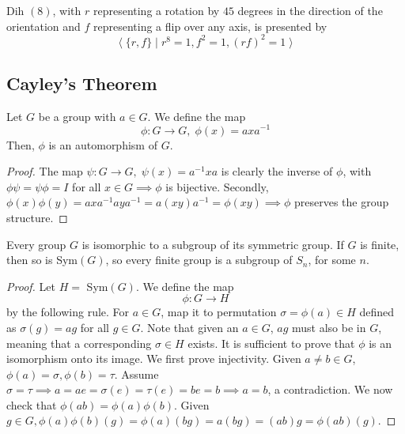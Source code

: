 \documentclass{article}
\begin{document}
      \begin{example}
        Dih $(8)$, with $r$ representing a rotation by $45$ degrees in the direction of the orientation and $f$ representing a flip over any axis, is presented by
        \begin{equation}
          \big\langle \; \{ r, f\} \; | \; r^{8} = 1, f^{2} = 1, (r f)^{2} = 1 \;\big\rangle
        \end{equation}
      \end{example}

  \subsection{Cayley's Theorem}

    \begin{lemma}
      Let $G$ be a group with $a \in G$. We define the map
      \begin{equation}
        \phi: G \longrightarrow G, \; \phi (x) = a x a^{-1}
      \end{equation}
      Then, $\phi$ is an automorphism of $G$. 
    \end{lemma}
    \begin{proof}
      The map $\psi: G \longrightarrow G, \; \psi(x) = a^{-1} x a$ is clearly the inverse of $\phi$, with $\phi \psi = \psi \phi = I$ for all $x \in G \implies \phi$ is bijective. Secondly, $\phi(x) \phi(y) = a x a^{-1} a y a^{-1} = a (x y) a ^{-1} = \phi (x y) \implies \phi$ preserves the group structure. 
    \end{proof}

    \begin{theorem}
      Every group $G$ is isomorphic to a subgroup of its symmetric group. If $G$ is finite, then so is Sym$(G)$, so every finite group is a subgroup of $S_{n}$, for some $n$.
    \end{theorem}
    \begin{proof}
      Let $H =$ Sym$(G)$. We define the map
      \begin{equation}
        \phi: G \longrightarrow H
      \end{equation}
      by the following rule. For $a \in G$, map it to permutation $\sigma = \phi (a) \in H$ defined as $\sigma(g) = a g$ for all $g \in G$. Note that given an $a \in G$, $a g$ must also be in $G$, meaning that a corresponding $\sigma \in H$ exists. It is sufficient to prove that $\phi$ is an isomorphism onto its image. We first prove injectivity. Given $a \neq b \in G$, $\phi(a)=\sigma, \phi(b) = \tau$. Assume $\sigma = \tau \implies a = a e =  \sigma(e) = \tau (e) = b e = b \implies a = b$, a contradiction. We now check that $\phi(a b) = \phi(a) \phi(b)$. Given $g \in G, \phi(a) \phi(b) (g) = \phi(a) (bg) = a(bg)= (ab) g = \phi(ab) (g).$
    \end{proof}
\end{document}
